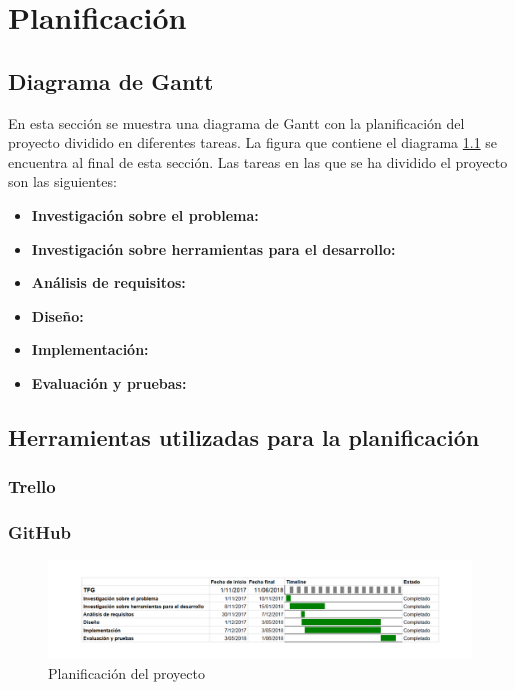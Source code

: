 \chapter{Planificación}
\section[Diagrama de Gantt]{Diagrama de Gantt}
En esta sección se muestra una diagrama de Gantt con la planificación del proyecto dividido en diferentes tareas. La figura que contiene el diagrama \ref{fig:gantt} se encuentra al final de esta sección. Las tareas en las que se ha dividido el proyecto son las siguientes:
\begin{itemize}
	\item \textbf{Investigación sobre el problema:}
	\item \textbf{Investigación sobre herramientas para el desarrollo:}
	\item \textbf{Análisis de requisitos:}
	\item \textbf{Diseño:}
	\item \textbf{Implementación:}
	\item \textbf{Evaluación y pruebas:}
\end{itemize}

\section[Herramientas utilizadas para la planificación]{Herramientas utilizadas para la planificación}
\subsection{Trello}
\subsection{GitHub}

\begin{figure}[b]
	\centering
	\includegraphics[scale=0.55,angle=90]{imagenes/Gantt.png}
	\caption{Planificación del proyecto}
	\label{fig:gantt}
\end{figure}
